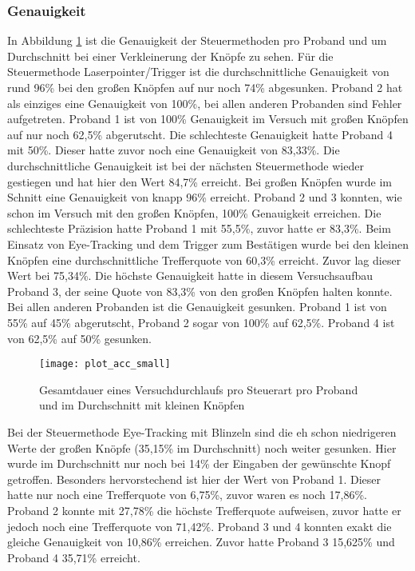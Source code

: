 \subsubsection{Genauigkeit}
In Abbildung \ref{fig:totalACCsmall} ist die Genauigkeit der Steuermethoden pro Proband und um Durchschnitt bei einer Verkleinerung der Knöpfe zu sehen. Für die Steuermethode Laserpointer/Trigger ist die durchschnittliche Genauigkeit von rund 96\% bei den großen Knöpfen auf nur noch 74\% abgesunken. Proband 2 hat als einziges eine Genauigkeit von 100\%, bei allen anderen Probanden sind Fehler aufgetreten. Proband 1 ist von 100\% Genauigkeit im Versuch mit großen Knöpfen auf nur noch 62,5\% abgerutscht. Die schlechteste Genauigkeit hatte Proband 4 mit 50\%. Dieser hatte zuvor noch eine Genauigkeit von 83,33\%. Die durchschnittliche Genauigkeit ist bei der nächsten Steuermethode wieder gestiegen und hat hier den Wert 84,7\% erreicht. Bei großen Knöpfen wurde im Schnitt eine Genauigkeit von knapp 96\% erreicht. Proband 2 und 3 konnten, wie schon im Versuch mit den großen Knöpfen, 100\% Genauigkeit erreichen. Die schlechteste Präzision hatte Proband 1 mit 55,5\%, zuvor hatte er 83,3\%. Beim Einsatz von Eye-Tracking und dem Trigger zum Bestätigen wurde bei den kleinen Knöpfen eine durchschnittliche Trefferquote von 60,3\% erreicht. Zuvor lag dieser Wert bei 75,34\%. Die höchste Genauigkeit hatte in diesem Versuchsaufbau Proband 3, der seine Quote von 83,3\% von den großen Knöpfen halten konnte. Bei allen anderen Probanden ist die Genauigkeit gesunken. Proband 1 ist von 55\% auf 45\% abgerutscht, Proband 2 sogar von 100\% auf 62,5\%. Proband 4 ist von 62,5\% auf 50\% gesunken.

\begin{figure}[!htbp]
	\centering
	\texttt{[image: plot\_acc\_small]}
	\caption[Gesamtdauer eines Versuchdurchlaufs pro Steuerart pro Proband und im Durchschnitt mit kleinen Knöpfen]{Gesamtdauer eines Versuchdurchlaufs pro Steuerart pro Proband und im Durchschnitt mit kleinen Knöpfen}
	\label{fig:totalACCsmall}
\end{figure}

Bei der Steuermethode Eye-Tracking mit Blinzeln sind die eh schon niedrigeren Werte der großen Knöpfe (35,15\% im Durchschnitt) noch weiter gesunken. Hier wurde im Durchschnitt nur noch bei 14\% der Eingaben der gewünschte Knopf getroffen. Besonders hervorstechend ist hier der Wert von Proband 1. Dieser hatte nur noch eine Trefferquote von 6,75\%, zuvor waren es noch 17,86\%. Proband 2 konnte mit 27,78\% die höchste Trefferquote aufweisen, zuvor hatte er jedoch noch eine Trefferquote von 71,42\%. Proband 3 und 4 konnten exakt die gleiche Genauigkeit von 10,86\% erreichen. Zuvor hatte Proband 3 15,625\% und Proband 4 35,71\% erreicht. 



